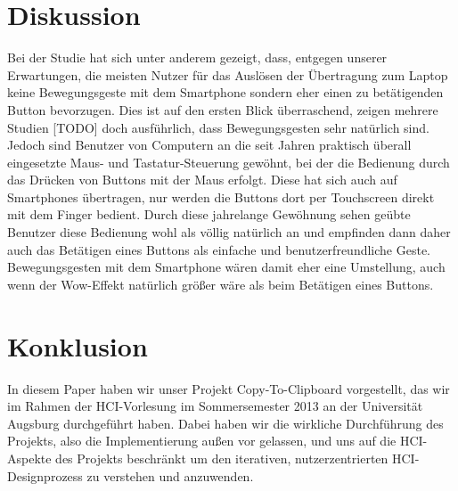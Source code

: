 \documentclass{chi-ext}
\begin{document}
\section{Diskussion}
Bei der Studie hat sich unter anderem gezeigt, dass, entgegen unserer Erwartungen, die meisten Nutzer für das Auslösen der Übertragung zum Laptop keine Bewegungsgeste mit dem Smartphone sondern eher einen zu betätigenden Button bevorzugen. Dies ist auf den ersten Blick überraschend, zeigen mehrere Studien [TODO] doch ausführlich, dass Bewegungsgesten sehr natürlich sind. Jedoch sind Benutzer von Computern an die seit Jahren praktisch überall eingesetzte Maus- und Tastatur-Steuerung gewöhnt, bei der die Bedienung durch das Drücken von Buttons mit der Maus erfolgt. Diese hat sich auch auf Smartphones übertragen, nur werden die Buttons dort per Touchscreen direkt mit dem Finger bedient. Durch diese jahrelange Gewöhnung sehen geübte Benutzer diese Bedienung wohl als völlig natürlich an und empfinden dann daher auch das Betätigen eines Buttons als einfache und benutzerfreundliche Geste. Bewegungsgesten mit dem Smartphone wären damit eher eine Umstellung, auch wenn der Wow-Effekt natürlich größer wäre als beim Betätigen eines Buttons.


\section{Konklusion}
In diesem Paper haben wir unser Projekt Copy-To-Clipboard vorgestellt, das wir im Rahmen der HCI-Vorlesung im Sommersemester 2013 an der Universität Augsburg durchgeführt haben. Dabei haben wir die wirkliche Durchführung des Projekts, also die Implementierung außen vor gelassen, und uns auf die HCI-Aspekte des Projekts beschränkt um den iterativen, nutzerzentrierten HCI-Designprozess zu verstehen und anzuwenden.



\balance


\end{document}
